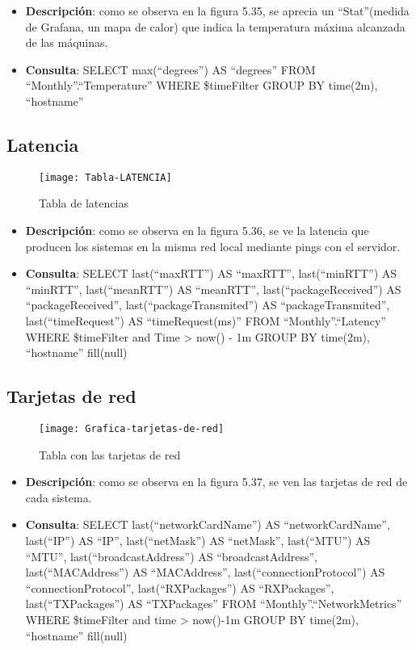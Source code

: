 \documentclass[ spanish, a4paper, 12pt, oneside]{report}
\begin{document}
\begin{itemize}
   \item \textbf{Descripción}: como se observa en la figura 5.35, se aprecia un ``Stat''(medida de Grafana, un mapa de calor) que indica la temperatura máxima alcanzada de las máquinas.
   \item \textbf{Consulta}: SELECT max(``degrees'') AS ``degrees'' FROM ``Monthly''.``Temperature'' WHERE \$timeFilter GROUP BY time(2m), ``hostname''
\end{itemize}

\subsection{Latencia}

\begin{figure}[!h]
   \centering
   \texttt{[image: Tabla-LATENCIA]}\\
      \caption{\label{fig: Tabla de latencias} Tabla de latencias}
\end{figure}

\begin{itemize}
   \item \textbf{Descripción}: como se observa en la figura 5.36, se ve la latencia que producen los sistemas en la misma red local mediante pings con el servidor.
   \item \textbf{Consulta}: SELECT last(``maxRTT'') AS ``maxRTT'', last(``minRTT'') AS ``minRTT'', last(``meanRTT'') AS ``meanRTT'', last(``packageReceived'') AS ``packageReceived'', last(``packageTransmited'') AS ``packageTransmited'', last(``timeRequest'') AS ``timeRequest(ms)'' FROM ``Monthly''.``Latency'' WHERE \$timeFilter and Time > now() - 1m GROUP BY time(2m), ``hostname'' fill(null)
\end{itemize}

\subsection{Tarjetas de red}

\begin{figure}[!h]
   \centering
   \texttt{[image: Grafica-tarjetas-de-red]}\\
      \caption{\label{fig: Tabla con las tarjetas de red} Tabla con las tarjetas de red}
\end{figure}

\begin{itemize}
   \item \textbf{Descripción}: como se observa en la figura 5.37, se ven las tarjetas de red de cada sistema.
   \item \textbf{Consulta}: SELECT last(``networkCardName'') AS ``networkCardName'', last(``IP'') AS ``IP'', last(``netMask'') AS ``netMask'', last(``MTU'') AS ``MTU'', last(``broadcastAddress'') AS ``broadcastAddress'', last(``MACAddress'') AS ``MACAddress'', last(``connectionProtocol'') AS ``connectionProtocol'', last(``RXPackages'') AS ``RXPackages'', last(``TXPackages'') AS ``TXPackages'' FROM ``Monthly''.``NetworkMetrics'' WHERE \$timeFilter  and time > now()-1m GROUP BY time(2m), ``hostname'' fill(null)
\end{itemize}
\end{document}
